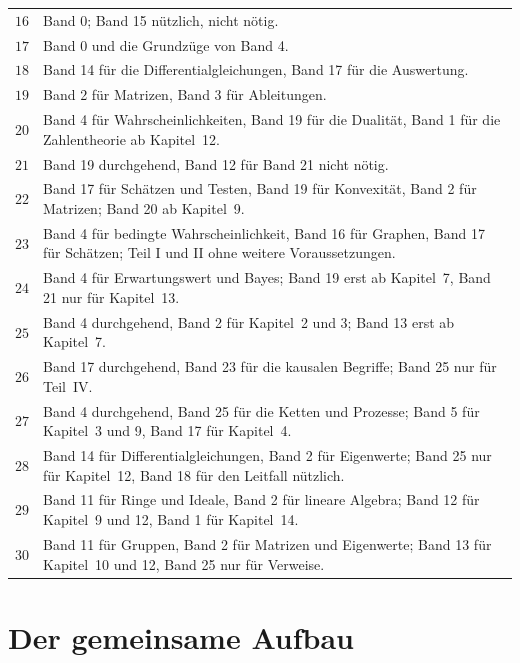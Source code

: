 \begin{merksatz}
\begin{center}
{\small
\renewcommand{\arraystretch}{1.44}
\begin{tabular}{@{}P{1.4cm}P{6.8cm}@{}}
\toprule
$16$ & Band 0; Band 15 nützlich, nicht nötig.\\
$17$ & Band 0 und die Grundzüge von Band 4.\\
$18$ & Band 14 für die Differentialgleichungen, Band 17 für die Auswertung.\\
$19$ & Band 2 für Matrizen, Band 3 für Ableitungen.\\
$20$ & Band 4 für Wahrscheinlichkeiten, Band 19 für die Dualität, Band 1 für die Zahlentheorie ab Kapitel~12.\\
$21$ & Band 19 durchgehend, Band 12 für Band 21 nicht nötig.\\
$22$ & Band 17 für Schätzen und Testen, Band 19 für Konvexität, Band 2 für Matrizen; Band 20 ab Kapitel~9.\\
$23$ & Band 4 für bedingte Wahrscheinlichkeit, Band 16 für Graphen, Band 17 für Schätzen; Teil I und II ohne weitere Voraussetzungen.\\
$24$ & Band 4 für Erwartungswert und Bayes; Band 19 erst ab Kapitel~7, Band 21 nur für Kapitel~13.\\
$25$ & Band 4 durchgehend, Band 2 für Kapitel~2 und 3; Band 13 erst ab Kapitel~7.\\
$26$ & Band 17 durchgehend, Band 23 für die kausalen Begriffe; Band 25 nur für Teil~IV.\\
$27$ & Band 4 durchgehend, Band 25 für die Ketten und Prozesse; Band 5 für Kapitel~3 und 9, Band 17 für Kapitel~4.\\
$28$ & Band 14 für Differentialgleichungen, Band 2 für Eigenwerte; Band 25 nur für Kapitel~12, Band 18 für den Leitfall nützlich.\\
$29$ & Band 11 für Ringe und Ideale, Band 2 für lineare Algebra; Band 12 für Kapitel~9 und 12, Band 1 für Kapitel~14.\\
$30$ & Band 11 für Gruppen, Band 2 für Matrizen und Eigenwerte; Band 13 für Kapitel~10 und 12, Band 25 nur für Verweise.\\
\bottomrule
\end{tabular}}
\end{center}
\end{merksatz}

\section{Der gemeinsame Aufbau}

